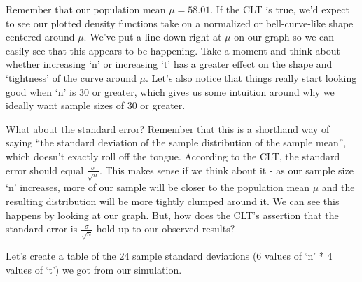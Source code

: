 \documentclass[]{article}
\newenvironment{Shaded}{\begin{snugshade}}{\end{snugshade}}
\newcommand{\KeywordTok}[1]{\textcolor[rgb]{0.13,0.29,0.53}{\textbf{{#1}}}}
\newcommand{\DataTypeTok}[1]{\textcolor[rgb]{0.13,0.29,0.53}{{#1}}}
\newcommand{\DecValTok}[1]{\textcolor[rgb]{0.00,0.00,0.81}{{#1}}}
\newcommand{\StringTok}[1]{\textcolor[rgb]{0.31,0.60,0.02}{{#1}}}
\newcommand{\CommentTok}[1]{\textcolor[rgb]{0.56,0.35,0.01}{\textit{{#1}}}}
\newcommand{\NormalTok}[1]{{#1}}
\begin{document}
Remember that our population mean $\mu = 58.01$. If the CLT is true,
we'd expect to see our plotted density functions take on a normalized or
bell-curve-like shape centered around $\mu$. We've put a line down right
at $\mu$ on our graph so we can easily see that this appears to be
happening. Take a moment and think about whether increasing `n' or
increasing `t' has a greater effect on the shape and `tightness' of the
curve around $\mu$. Let's also notice that things really start looking
good when `n' is 30 or greater, which gives us some intuition around why
we ideally want sample sizes of 30 or greater.

What about the standard error? Remember that this is a shorthand way of
saying ``the standard deviation of the sample distribution of the sample
mean'', which doesn't exactly roll off the tongue. According to the CLT,
the standard error should equal $\frac{\sigma}{\sqrt{n}}$. This makes
sense if we think about it - as our sample size `n' increases, more of
our sample will be closer to the population mean $\mu$ and the resulting
distribution will be more tightly clumped around it. We can see this
happens by looking at our graph. But, how does the CLT's assertion that
the standard error is $\frac{\sigma}{\sqrt{n}}$ hold up to our observed
results?

Let's create a table of the 24 sample standard deviations (6 values of
`n' * 4 values of `t') we got from our simulation.

\begin{Shaded}
\end{Shaded}
\end{document}
